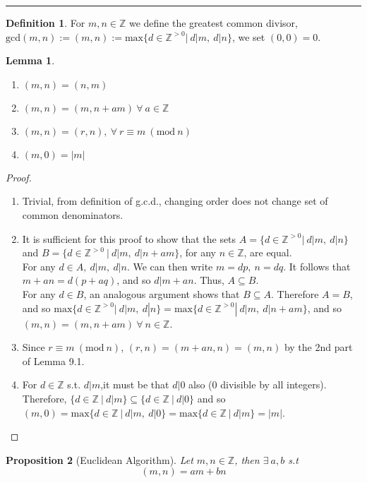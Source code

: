 \documentclass{article}
\newtheorem{theorem}{Proposition}[section]
\newtheorem{lemma}[theorem]{Lemma}
\theoremstyle{definition}
\newtheorem{definition}{Definition}[section]
\theoremstyle{remark}
\begin{document}
\hrule
\vspace{2mm}
\begin{definition}
	For $m,n\in\mathbb{Z}$ we define the greatest common divisor, $\mathrm{gcd}(m,n):=(m,n):=\mathrm{max}\lbrace d\in\mathbb{Z}^{>0}|~d|m,~d|n\rbrace$, we set $(0,0)=0$.
\end{definition}
\begin{lemma}~
	\begin{enumerate}
		\item $(m,n)=(n,m)$
		\item $(m,n)=(m,n+am)~\forall ~a\in \mathbb{Z}$
		\item $(m,n)=(r,n),~\forall ~r\equiv m ~(\mathrm{mod}~n)$
		\item $(m,0)=|m|$
	\end{enumerate}
\end{lemma}
\begin{proof}
	\begin{enumerate}
		\item Trivial, from definition of g.c.d., changing order does not change set of common denominators.
		\item It is sufficient for this proof to show that the sets $A=\lbrace d\in\mathbb{Z}^{>0}|~d|m,~d|n\rbrace$ and $B=\lbrace d\in\mathbb{Z}^{>0}~|~d|m,~d|n+am\rbrace$, for any $n\in\mathbb{Z}$, are equal.\\

		      For any $d\in A,~d|m,~d|n$. We can then write $m=dp,~n=dq$. It follows that $m+an=d(p+aq)$, and so $d|m+an$. Thus, $A\subseteq B$.\\
		      For any $d\in B$, an analogous argument shows that $B\subseteq A$. Therefore $A=B$, and so $\mathrm{max}\lbrace d\in\mathbb{Z}^{>0}|~d|m,~d|n\rbrace=\mathrm{max}\lbrace d\in\mathbb{Z}^{>0}|~d|m,~d|n+am\rbrace$, and so $(m,n)=(m,n+am)~\forall~n\in\mathbb{Z}$.
		\item Since $r\equiv m~(\mathrm{mod}~n)$, $(r,n)=(m+an,n)=(m,n)$ by the 2nd part of Lemma 9.1.
		\item For $d\in\mathbb{Z}$ s.t. $d|m$,it must be that $d|0$ also (0 divisible by all integers). Therefore, $\lbrace d\in\mathbb{Z}~|~d|m\rbrace \subseteq \lbrace d\in\mathbb{Z}~|~d|0\rbrace$ and so $(m,0)=\mathrm{max}\lbrace d\in\mathbb{Z}~|~d|m,~d|0\rbrace=\mathrm{max}\lbrace d\in\mathbb{Z}~|~d|m\rbrace=|m|$.
	\end{enumerate}
\end{proof}
\begin{theorem}[Euclidean Algorithm]
	\label{EuclidAlg}
	Let $m,n\in\mathbb{Z}$, then $\exists~a,b$ s.t
	\begin{equation}
		(m,n)=am+bn
	\end{equation}
\end{theorem}
\end{document}
